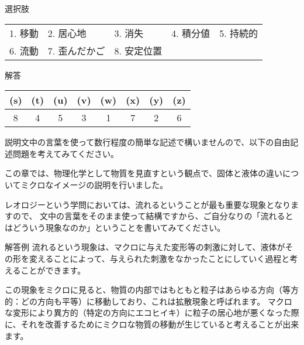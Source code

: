 \documentclass[uplatex,dvipdfmx,a4paper,11pt]{jsarticle}
\begin{document}
\begin{qlist}
		\begin{itembox}[l]{選択肢}
			\begin{center}
				\begin{tabular}{lllll}
					1. 移動	&2. 居心地 	&3. 消失	&4. 積分値	&5. 持続的\\
					6. 流動	&7. 歪んだかご &8. 安定位置
				\end{tabular}
			\end{center}
		\end{itembox}
\end{qlist}

\begin{itembox}[l]{解答}
    \begin{center} 
      \begin{tabular}{|c|c|c|c|c|c|c|c|} \hline
        (s) & (t) & (u) & (v) & (w) & (x) & (y) & (z) \\ \hline
        8 & 4 & 5 & 3 & 1 & 7 & 2 & 6 \\ \hline		
      \end{tabular}
    \end{center}
\end{itembox}

\clearpage

説明文中の言葉を使って数行程度の簡単な記述で構いませんので、以下の自由記述問題を考えてみてください。
\begin{qlist}
\qitem この章では、物理化学として物質を見直すという観点で、固体と液体の違いについてミクロなイメージの説明を行いました。

レオロジーという学問においては、流れるということが最も重要な現象となりますので、
文中の言葉をそのまま使って結構ですから、ご自分なりの「流れるとはどういう現象なのか」ということを書いてみてください。
\end{qlist}

\begin{itembox}[l]{解答例}
    流れるという現象は、マクロに与えた変形等の刺激に対して、液体がその形を変えることによって、与えられた刺激をなかったことにしていく過程と考えることができます。

	この現象をミクロに見ると、物質の内部ではもともと粒子はあらゆる方向（等方的：どの方向も平等）に移動しており、これは拡散現象と呼ばれます。
	マクロな変形により異方的（特定の方向にエコヒイキ）に粒子の居心地が悪くなった際に、それを改善するためにミクロな物質の移動が生じていると考えることが出来ます。
\end{itembox}

\clearpage
\end{document}
